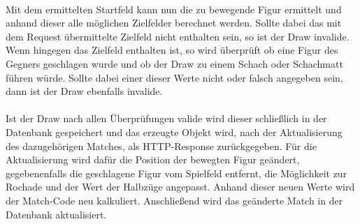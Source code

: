 \\
Mit dem ermittelten Startfeld kann nun die zu bewegende Figur ermittelt und anhand dieser alle möglichen Zielfelder berechnet werden. Sollte dabei das mit dem Request übermittelte Zielfeld nicht enthalten sein, so ist der Draw invalide. Wenn hingegen das Zielfeld enthalten ist, so wird überprüft ob eine Figur des Gegners geschlagen wurde und ob der Draw zu einem Schach oder Schachmatt führen würde. Sollte dabei einer dieser Werte nicht oder falsch angegeben sein, dann ist der Draw ebenfalls invalide.\\
\\
Ist der Draw nach allen Überprüfungen valide wird dieser schließlich in der Datenbank gespeichert und das erzeugte Objekt wird, nach der Aktualisierung des dazugehörigen Matches, als \gls{HTTP}-Response zurückgegeben. Für die Aktualisierung wird dafür die Position der bewegten Figur geändert, gegebenenfalls die geschlagene Figur vom Spielfeld entfernt, die Möglichkeit zur Rochade und der Wert der Halbzüge angepasst. Anhand dieser neuen Werte wird der Match-Code neu kalkuliert. Anschließend wird das geänderte Match in der Datenbank aktualisiert.